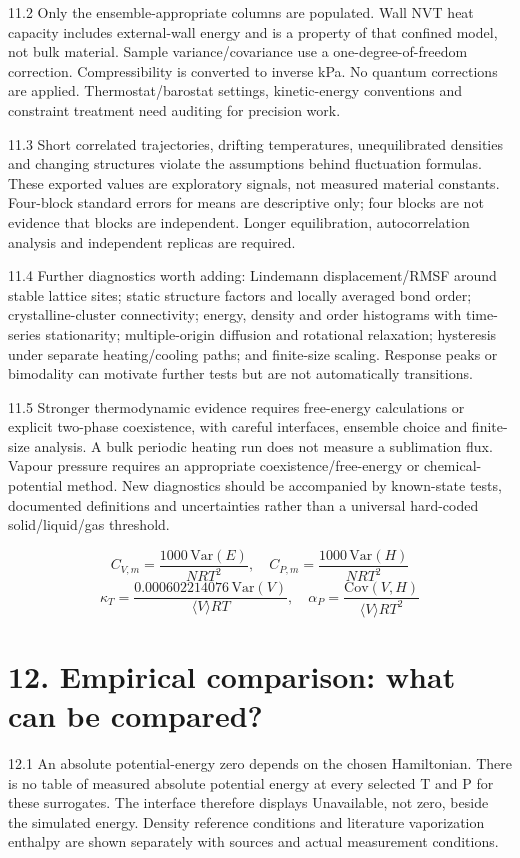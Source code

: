 \documentclass[11pt]{article}
\begin{document}
11.2 Only the ensemble-appropriate columns are populated. Wall NVT heat capacity includes external-wall energy and is a property of that confined model, not bulk material. Sample variance/covariance use a one-degree-of-freedom correction. Compressibility is converted to inverse kPa. No quantum corrections are applied. Thermostat/barostat settings, kinetic-energy conventions and constraint treatment need auditing for precision work.


11.3 Short correlated trajectories, drifting temperatures, unequilibrated densities and changing structures violate the assumptions behind fluctuation formulas. These exported values are exploratory signals, not measured material constants. Four-block standard errors for means are descriptive only; four blocks are not evidence that blocks are independent. Longer equilibration, autocorrelation analysis and independent replicas are required.


11.4 Further diagnostics worth adding: Lindemann displacement/RMSF around stable lattice sites; static structure factors and locally averaged bond order; crystalline-cluster connectivity; energy, density and order histograms with time-series stationarity; multiple-origin diffusion and rotational relaxation; hysteresis under separate heating/cooling paths; and finite-size scaling. Response peaks or bimodality can motivate further tests but are not automatically transitions.


11.5 Stronger thermodynamic evidence requires free-energy calculations or explicit two-phase coexistence, with careful interfaces, ensemble choice and finite-size analysis. A bulk periodic heating run does not measure a sublimation flux. Vapour pressure requires an appropriate coexistence/free-energy or chemical-potential method. New diagnostics should be accompanied by known-state tests, documented definitions and uncertainties rather than a universal hard-coded solid/liquid/gas threshold.


\[C_{V,m}=\frac{1000\,\mathrm{Var}(E)}{NRT^2},\quad C_{P,m}=\frac{1000\,\mathrm{Var}(H)}{NRT^2}\]
\[\kappa_T=\frac{0.000602214076\,\mathrm{Var}(V)}{\langle V\rangle RT},\quad\alpha_P=\frac{\mathrm{Cov}(V,H)}{\langle V\rangle RT^2}\]
\section*{12. Empirical comparison: what can be compared?}
12.1 An absolute potential-energy zero depends on the chosen Hamiltonian. There is no table of measured absolute potential energy at every selected T and P for these surrogates. The interface therefore displays Unavailable, not zero, beside the simulated energy. Density reference conditions and literature vaporization enthalpy are shown separately with sources and actual measurement conditions.
\end{document}
